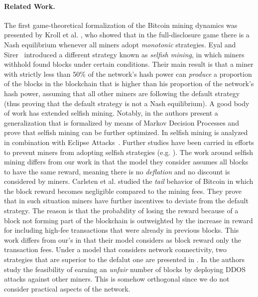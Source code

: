 \paragraph*{\bf Related Work.} The first game-theoretical formalization of the Bitcoin mining dynamics was presented by Kroll et al. \cite{economics_of_mining2013}, who showed that in the full-disclosure game there is a Nash equilibrium whenever all miners adopt \emph{monotonic} strategies. Eyal and Sirer~\cite{selfishmining2014} introduced a different strategy known as \emph{selfish mining}, in which miners withhold found blocks under certain conditions. Their main result is that a miner with strictly less than 50\% of the network's hash power can \emph{produce} a proportion of the blocks in the blockchain that is higher than his proportion of the network's hash power, assuming that all other miners are following the default strategy (thus proving that the default strategy is not a Nash equilibrium). A good body of work has extended selfish mining. Notably, in \cite{optimalselfishmining2017} the authors present a generalization that is formalized by means of Markov Decision Processes and prove that selfish mining can be further optimized. In \cite{stubborn_mining:2016} selfish mining is analyzed in combination with Eclipse Attacks~\cite{eclipseattacks2015}. Further studies have been carried in efforts to prevent miners from adopting selfish strategies (e.g. \cite{stop_selfish_mining2014,selfishmining2014}). The work around selfish mining differs from our work in that the model they consider assumes all blocks to have the same reward, meaning there is no \emph{deflation} and no discount is considered by miners. Carlsten et al. \cite{instabilitywithoutreward:2016} studied the \emph{tail} behavior of Bitcoin in which the block reward becomes negligible compared to the mining fees. They prove that in such situation miners have further incentives to deviate from the default strategy. The reason is that the probability of losing the reward because of a block not forming part of the blockchain is outweighted by the increase in reward for including high-fee transactions that were already in previous blocks. This work differs from our's in that their model considers as block reward only the transaction fees. Under a model that considers network connectivity, two strategies that are superior to the defalut one are presented in \cite{bitcoin_attacks_2013}. In \cite{ddos_attacks2014,empirical_dos_attacks2014} the authors study the feasibility of earning an \emph{unfair} number of blocks by deploying DDOS attacks against other miners. This is somehow orthogonal since we do not consider practical aspects of the network. 


